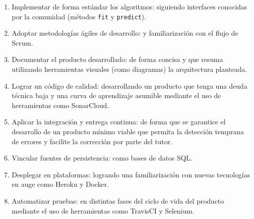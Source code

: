 \begin{enumerate}
	\item Implementar de forma estándar los algoritmos: siguiendo interfaces conocidas por la comunidad (métodos \texttt{fit} y \texttt{predict}).
	\item Adoptar metodologías ágiles de desarrollo: y familiarización con el flujo de Scrum.
	\item Documentar el producto desarrollado: de forma concisa y que resuma utilizando herramientas visuales (como diagramas) la arquitectura planteada.
	\item Lograr un código de calidad: desarrollando un producto que tenga una deuda técnica baja y una curva de aprendizaje asumible mediante el uso de herramientas como SonarCloud.
	\item Aplicar la integración y entrega continua: de forma que se garantice el desarrollo de un producto mínimo viable que permita la detección temprana de errores y facilite la corrección por parte del tutor.
	\item Vincular fuentes de persistencia: como bases de datos SQL.
	\item Desplegar en plataformas: logrando una familiarización con nuevas tecnologías en auge como Heroku y Docker.
	\item Automatizar pruebas: en distintas fases del ciclo de vida del producto mediante el uso de herramientas como TravisCI y Selenium.
	
\end{enumerate}